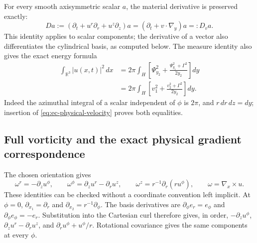 For every smooth axisymmetric scalar \(a\), the material derivative is
preserved exactly:
\begin{equation}
 D a:=(\partial_t+u^r\partial_r+u^z\partial_z)a
   =(\partial_t+v\cdot\nabla_y)a=:D_v a.
 \label{eq:ec-material}
\end{equation}
This identity applies to scalar components; the derivative of a vector
also differentiates the cylindrical basis, as computed below.
The measure identity also gives the exact energy formula
\begin{align}
 \int_{\mathbb R^3}|u(x,t)|^2\,dx
 &=2\pi\int_H\left[
       \Psi_{y_2}^2+\frac{\Psi_{y_1}^2+\Gamma^2}{2y_2}\right]dy
 \label{eq:ec-energy}\\
 &=2\pi\int_H\left[v_1^2+\frac{v_2^2+\Gamma^2}{2y_2}\right]dy.
 \nonumber
\end{align}
Indeed the azimuthal integral of a scalar independent of \(\phi\) is
\(2\pi\), and \(r\,dr\,dz=dy\); insertion of
\eqref{eq:ec-physical-velocity} proves both equalities.

\subsection{Full vorticity and the exact physical gradient correspondence}

The chosen orientation gives
\begin{equation}
 \omega^r=-\partial_z u^\phi,\qquad
 \omega^\phi=\partial_z u^r-\partial_r u^z,\qquad
 \omega^z=r^{-1}\partial_r(r u^\phi),
 \qquad \omega=\nabla_x\times u.
 \label{eq:ec-curl-cylindrical}
\end{equation}
These identities can be checked without a coordinate convention left
implicit.  At \(\phi=0\),
\(\partial_{x_1}=\partial_r\) and
\(\partial_{x_2}=r^{-1}\partial_\phi\).
The basis derivatives are
\(\partial_\phi e_r=e_\phi\) and
\(\partial_\phi e_\phi=-e_r\).
Substitution into the Cartesian curl therefore gives, in order,
\(-\partial_z u^\phi\),
\(\partial_z u^r-\partial_r u^z\), and
\(\partial_r u^\phi+u^\phi/r\).
Rotational covariance gives the same components at every \(\phi\).

